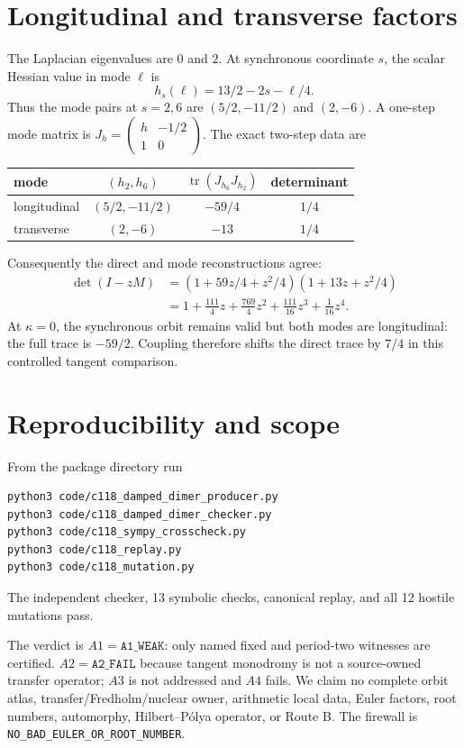 \documentclass[10pt]{article}
\begin{document}
\section{Longitudinal and transverse factors}
The Laplacian eigenvalues are $0$ and $2$.  At synchronous coordinate $s$,
the scalar Hessian value in mode $\ell$ is
\[
 h_s(\ell)=13/2-2s-\ell/4.
\]
Thus the mode pairs at $s=2,6$ are $(5/2,-11/2)$ and $(2,-6)$.  A one-step
mode matrix is $J_h=\left(\begin{smallmatrix}h&-1/2\\1&0\end{smallmatrix}\right)$.
The exact two-step data are
\begin{center}
\begin{tabular}{@{}lccc@{}}
\toprule
mode & $(h_2,h_6)$ & $\operatorname{tr}(J_{h_6}J_{h_2})$ & determinant\\
\midrule
longitudinal & $(5/2,-11/2)$ & $-59/4$ & $1/4$\\
transverse & $(2,-6)$ & $-13$ & $1/4$\\
\bottomrule
\end{tabular}
\end{center}
Consequently the direct and mode reconstructions agree:
\begin{align*}
 \det(I-zM)&=(1+59z/4+z^2/4)(1+13z+z^2/4)\\
 &=1+\tfrac{111}{4}z+\tfrac{769}{4}z^2
   +\tfrac{111}{16}z^3+\tfrac1{16}z^4.
\end{align*}
At $\kappa=0$, the synchronous orbit remains valid but both modes are
longitudinal: the full trace is $-59/2$.  Coupling therefore shifts the direct
trace by $7/4$ in this controlled tangent comparison.

\section{Reproducibility and scope}
From the package directory run
\begin{verbatim}
python3 code/c118_damped_dimer_producer.py
python3 code/c118_damped_dimer_checker.py
python3 code/c118_sympy_crosscheck.py
python3 code/c118_replay.py
python3 code/c118_mutation.py
\end{verbatim}
The independent checker, 13 symbolic checks, canonical replay, and all 12
hostile mutations pass.

The verdict is $A1=\texttt{A1\_WEAK}$: only named fixed and period-two
witnesses are certified.  $A2=\texttt{A2\_FAIL}$ because tangent monodromy is
not a source-owned transfer operator; $A3$ is not addressed and $A4$ fails.
We claim no complete orbit atlas, transfer/Fredholm/nuclear owner, arithmetic
local data, Euler factors, root numbers, automorphy, Hilbert--P\'olya operator,
or Route B.  The firewall is \texttt{NO\_BAD\_EULER\_OR\_ROOT\_NUMBER}.
\end{document}
